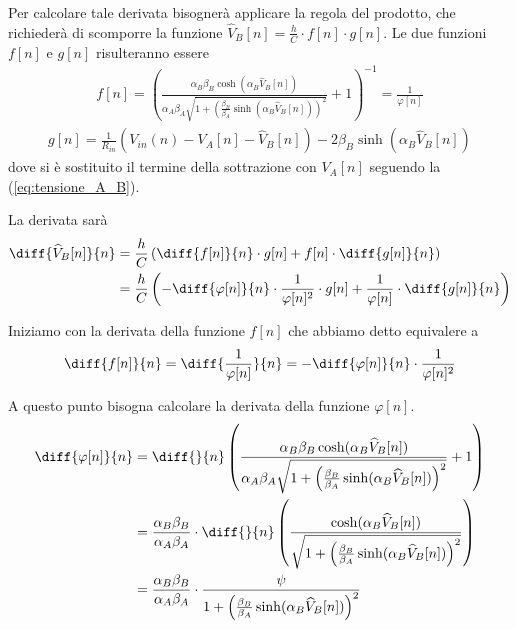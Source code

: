 		Per calcolare tale derivata bisognerà applicare la regola del prodotto, che richiederà di scomporre la funzione $\widehat V_{B}[n] = \frac{h}{C}\cdot f[n]\cdot g[n]$.
		Le due funzioni $f[n]$ e $g[n]$ risulteranno essere
		\begin{equation}
			\begin{split}
				f[n] = \left(\frac{\alpha_{B}\beta_{B}\cosh(\alpha_{B}\widehat V_{B}[n])}{\alpha_{A}\beta_{A}\sqrt{1+\left(\frac{\beta_{B}}{\beta_{A}}\sinh(\alpha_{B}\widehat V_{B}[n])\right)^{2}}}+1\right)^{-1} = \frac{1}{\varphi[n]}
			\end{split}
		\end{equation}
		\begin{equation}
			\begin{split}
				g[n] = \frac{1}{R_{in}}\left(V_{in}(n)-V_{A}[n]-\widehat V_{B}[n]\right)-2\beta_{B}\sinh(\alpha_{B}\widehat V_{B}[n])
			\end{split}
		\end{equation}
		dove si è sostituito il termine della sottrazione con $V_{A}[n]$ seguendo la (\ref{eq:tensione_A_B}).

		La derivata sarà
		\begin{equation}
			\label{eq:jacobiano}
			\begin{split}
				\diff{\widehat V_{B}[n]}{n} &= \frac{h}{C}\left(\diff{f[n]}{n}\cdot g[n]+f[n]\cdot \diff{g[n]}{n}\right)\\
				&= \frac{h}{C}\left(-\diff{\varphi[n]}{n}\cdot\frac{1}{\varphi[n]^{2}}\cdot g[n]+\frac{1}{\varphi[n]}\cdot \diff{g[n]}{n}\right)
			\end{split}
		\end{equation}

		Iniziamo con la derivata della funzione $f[n]$ che abbiamo detto equivalere a
		\begin{equation}
			\label{eq:jacobiano}
			\begin{split}
				\diff{f[n]}{n} = \diff{\frac{1}{\varphi[n]}}{n} = -\diff{\varphi[n]}{n}\cdot\frac{1}{\varphi[n]^{2}}
			\end{split}
		\end{equation}

		
		A questo punto bisogna calcolare la derivata della funzione $\varphi[n]$.
		\begin{equation}
			\begin{split}
				\diff{\varphi[n]}{n} &= \diff{}{n}\left(\frac{\alpha_{B}\beta_{B}\cosh(\alpha_{B}\widehat V_{B}[n])}{\alpha_{A}\beta_{A}\sqrt{1+\left(\frac{\beta_{B}}{\beta_{A}}\sinh(\alpha_{B}\widehat V_{B}[n])\right)^{2}}}+1\right)\\
				&= \frac{\alpha_{B}\beta_{B}}{\alpha_{A}\beta_{A}}\cdot\diff{}{n}\left(\frac{\cosh(\alpha_{B}\widehat V_{B}[n])}{\sqrt{1+\left(\frac{\beta_{B}}{\beta_{A}}\sinh(\alpha_{B}\widehat V_{B}[n])\right)^{2}}}\right)\\
				&= \frac{\alpha_{B}\beta_{B}}{\alpha_{A}\beta_{A}}\cdot\frac{\psi}{1+\left(\frac{\beta_{B}}{\beta_{A}}\sinh(\alpha_{B}\widehat V_{B}[n])\right)^{2}}
			\end{split}
		\end{equation}
		
